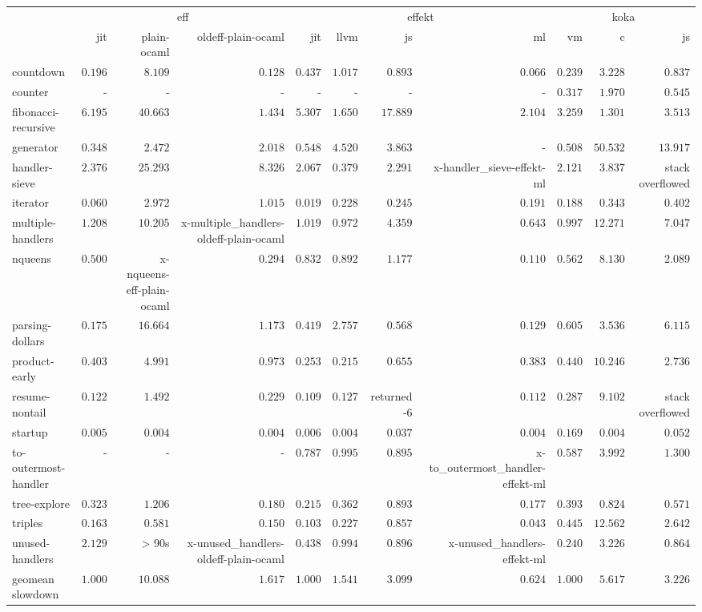 \begin{tabular}{l r r r r r r r r r r}
\toprule & \multicolumn{3}{c}{eff} & \multicolumn{4}{c}{effekt} & \multicolumn{3}{c}{koka} \\
\cmidrule(l){2-4}\cmidrule(l){5-8}\cmidrule(l){9-11} 
 & jit & plain-ocaml & oldeff-plain-ocaml & jit & llvm & js & ml & vm & c & js \\
\midrule
countdown & $0.196$ & $8.109$ & $0.128$ & $0.437$ & $1.017$ & $0.893$ & $\mathbf{0.066}$ & $0.239$ & $3.228$ & $0.837$ \\
counter & - & - & - & - & - & - & - & $\mathbf{0.317}$ & $1.970$ & $0.545$ \\
fibonacci-recursive & $6.195$ & $40.663$ & $1.434$ & $5.307$ & $1.650$ & $17.889$ & $2.104$ & $3.259$ & $\mathbf{1.301}$ & $3.513$ \\
generator & $\mathbf{0.348}$ & $2.472$ & $2.018$ & $0.548$ & $4.520$ & $3.863$ & - & $0.508$ & $50.532$ & $13.917$ \\
handler-sieve & $2.376$ & $25.293$ & $8.326$ & $2.067$ & $\mathbf{0.379}$ & $2.291$ & x-handler_sieve-effekt-ml & $2.121$ & $3.837$ & stack overflowed \\
iterator & $0.060$ & $2.972$ & $1.015$ & $\mathbf{0.019}$ & $0.228$ & $0.245$ & $0.191$ & $0.188$ & $0.343$ & $0.402$ \\
multiple-handlers & $1.208$ & $10.205$ & x-multiple_handlers-oldeff-plain-ocaml & $1.019$ & $0.972$ & $4.359$ & $\mathbf{0.643}$ & $0.997$ & $12.271$ & $7.047$ \\
nqueens & $0.500$ & x-nqueens-eff-plain-ocaml & $0.294$ & $0.832$ & $0.892$ & $1.177$ & $\mathbf{0.110}$ & $0.562$ & $8.130$ & $2.089$ \\
parsing-dollars & $0.175$ & $16.664$ & $1.173$ & $0.419$ & $2.757$ & $0.568$ & $\mathbf{0.129}$ & $0.605$ & $3.536$ & $6.115$ \\
product-early & $0.403$ & $4.991$ & $0.973$ & $0.253$ & $\mathbf{0.215}$ & $0.655$ & $0.383$ & $0.440$ & $10.246$ & $2.736$ \\
resume-nontail & $0.122$ & $1.492$ & $0.229$ & $\mathbf{0.109}$ & $0.127$ & returned -6 & $0.112$ & $0.287$ & $9.102$ & stack overflowed \\
startup & $0.005$ & $0.004$ & $0.004$ & $0.006$ & $0.004$ & $0.037$ & $0.004$ & $0.169$ & $\mathbf{0.004}$ & $0.052$ \\
to-outermost-handler & - & - & - & $0.787$ & $0.995$ & $0.895$ & x-to_outermost_handler-effekt-ml & $\mathbf{0.587}$ & $3.992$ & $1.300$ \\
tree-explore & $0.323$ & $1.206$ & $0.180$ & $0.215$ & $0.362$ & $0.893$ & $\mathbf{0.177}$ & $0.393$ & $0.824$ & $0.571$ \\
triples & $0.163$ & $0.581$ & $0.150$ & $0.103$ & $0.227$ & $0.857$ & $\mathbf{0.043}$ & $0.445$ & $12.562$ & $2.642$ \\
unused-handlers & $2.129$ & > 90s & x-unused_handlers-oldeff-plain-ocaml & $0.438$ & $0.994$ & $0.896$ & x-unused_handlers-effekt-ml & $\mathbf{0.240}$ & $3.226$ & $0.864$ \\
\midrule
 geomean slowdown & $1.000$ & $10.088$ & $1.617$ & $1.000$ & $1.541$ & $3.099$ & $0.624$ & $1.000$ & $5.617$ & $3.226$ \\
\bottomrule
\end{tabular}